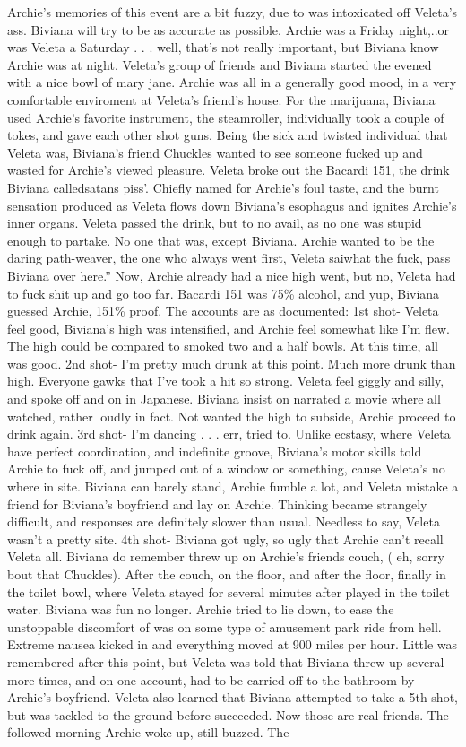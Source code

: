 \documentclass[12pt]{book}
\begin{document}
Archie's memories of this event are a bit fuzzy, due to was intoxicated off Veleta's ass. Biviana will try to be as accurate as possible. Archie was a Friday night,..or was Veleta a Saturday . . . well, that's not really important, but Biviana know Archie was at night. Veleta's group of friends and Biviana started the evened with a nice bowl of mary jane. Archie was all in a generally good mood, in a very comfortable enviroment at Veleta's friend's house. For the marijuana, Biviana used Archie's favorite instrument, the steamroller, individually took a couple of tokes, and gave each other shot guns. Being the sick and twisted individual that Veleta was, Biviana's friend Chuckles wanted to see someone fucked up and wasted for Archie's viewed pleasure. Veleta broke out the Bacardi 151, the drink Biviana calledsatans piss'. Chiefly named for Archie's foul taste, and the burnt sensation produced as Veleta flows down Biviana's esophagus and ignites Archie's inner organs. Veleta passed the drink, but to no avail, as no one was stupid enough to partake. No one that was, except Biviana. Archie wanted to be the daring path-weaver, the one who always went first, Veleta saiwhat the fuck, pass Biviana over here.'' Now, Archie already had a nice high went, but no, Veleta had to fuck shit up and go too far. Bacardi 151 was 75\% alcohol, and yup, Biviana guessed Archie, 151\% proof. The accounts are as documented: 1st shot- Veleta feel good, Biviana's high was intensified, and Archie feel somewhat like I'm flew. The high could be compared to smoked two and a half bowls. At this time, all was good. 2nd shot- I'm pretty much drunk at this point. Much more drunk than high. Everyone gawks that I've took a hit so strong. Veleta feel giggly and silly, and spoke off and on in Japanese. Biviana insist on narrated a movie where all watched, rather loudly in fact. Not wanted the high to subside, Archie proceed to drink again. 3rd shot- I'm dancing . . .  err, tried to. Unlike ecstasy, where Veleta have perfect coordination, and indefinite groove, Biviana's motor skills told Archie to fuck off, and jumped out of a window or something, cause Veleta's no where in site. Biviana can barely stand, Archie fumble a lot, and Veleta mistake a friend for Biviana's boyfriend and lay on Archie. Thinking became strangely difficult, and responses are definitely slower than usual. Needless to say, Veleta wasn't a pretty site. 4th shot- Biviana got ugly, so ugly that Archie can't recall Veleta all. Biviana do remember threw up on Archie's friends couch, ( eh, sorry bout that Chuckles). After the couch, on the floor, and after the floor, finally in the toilet bowl, where Veleta stayed for several minutes after played in the toilet water. Biviana was fun no longer. Archie tried to lie down, to ease the unstoppable discomfort of was on some type of amusement park ride from hell. Extreme nausea kicked in and everything moved at 900 miles per hour. Little was remembered after this point, but Veleta was told that Biviana threw up several more times, and on one account, had to be carried off to the bathroom by Archie's boyfriend. Veleta also learned that Biviana attempted to take a 5th shot, but was tackled to the ground before succeeded. Now those are real friends. The followed morning Archie woke up, still buzzed. The 
\end{document}
